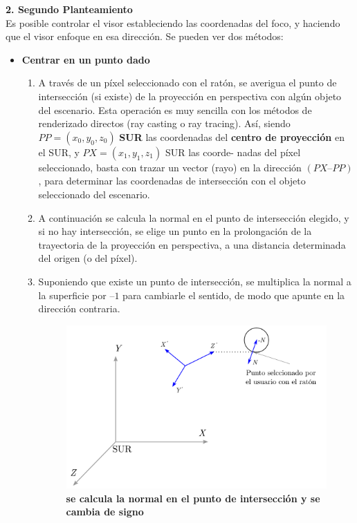 \clearpage

\textbf{2. Segundo Planteamiento}\\
Es posible controlar el visor estableciendo las coordenadas del foco, y haciendo que el visor enfoque en esa dirección. Se pueden ver dos métodos:
\begin{itemize}
    \item \textbf{Centrar en un punto dado}
    \begin{enumerate}
        \item A través de un píxel seleccionado con el ratón, se averigua el punto de intersección (si existe) de la proyección en perspectiva con algún objeto del escenario. Esta operación es muy sencilla con los métodos de renderizado directos (ray casting o ray tracing). Así, siendo $PP = (x_0, y_0, z_0)$ \textbf{SUR} las coordenadas del \textbf{centro de proyección} en el SUR, y $PX = (x_1, y_1, z_1)$ SUR las coorde- nadas del píxel seleccionado, basta con trazar un vector (rayo) en la dirección $(PX – PP)$, para determinar las coordenadas de intersección con el objeto seleccionado del escenario.
        
        \item A continuación se calcula la normal en el punto de intersección elegido, y si no hay intersección, se elige un punto en la prolongación de la trayectoria de la proyección en perspectiva, a una distancia determinada del origen (o del píxel).
        
        \item Suponiendo que existe un punto de intersección, se multiplica la normal a la superficie por $–1$ para cambiarle el sentido, de modo que apunte en la dirección contraria.
        
        \begin{figure}[h]
        \includegraphics[width=12cm]{Img/GEO/geo-visor-10.png}
        \centering
        \caption{\footnotesize{\textbf{se calcula la normal en el punto de intersección y se cambia de signo}}}
        \label{geo-visor10}
        \end{figure}
        

\end{enumerate}
\end{itemize}
